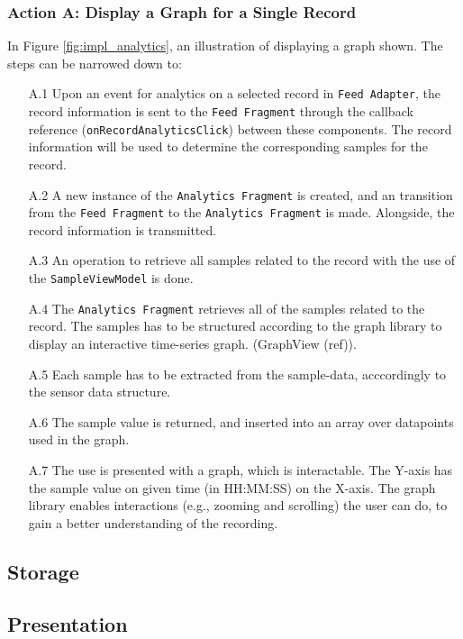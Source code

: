 \subsubsection{Action A: Display a Graph for a Single Record}
In Figure \ref{fig:impl_analytics}, an illustration of displaying a graph shown. The steps can be narrowed down to:

\begin{itemize}
    \item[A.1] Upon an event for analytics on a selected record in \verb|Feed Adapter|, the record information is sent to the \verb|Feed Fragment| through the callback reference (\verb|onRecordAnalyticsClick|) between these components. The record information will be used to determine the corresponding samples for the record.
    \item[A.2] A new instance of the \verb|Analytics Fragment| is created, and an transition from the \verb|Feed Fragment| to the \verb|Analytics Fragment| is made. Alongside, the record information is transmitted.
    \item[A.3] An operation to retrieve all samples related to the record with the use of the \verb|SampleViewModel| is done. 
    \item[A.4] The \verb|Analytics Fragment| retrieves all of the samples related to the record. The samples has to be structured according to the graph library to display an interactive time-series graph. (GraphView (ref)).
    \item[A.5] Each sample has to be extracted from the sample-data, acccordingly to the sensor data structure.
    \item[A.6] The sample value is returned, and inserted into an array over datapoints used in the graph. 
    \item[A.7] The use is presented with a graph, which is interactable. The Y-axis has the sample value on given time (in HH:MM:SS) on the X-axis. The graph library enables interactions (e.g., zooming and scrolling) the user can do, to gain a better understanding of the recording. 
\end{itemize}



\subsection{Storage}


\subsection{Presentation}

